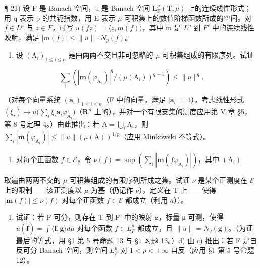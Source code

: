 ¶ 21) 设 F 是 Banach 空间，u 是 Banach 空间 \(\mathrm{L}_{\mathrm{F}}^{p}(\mathrm{T},\mu)\) 上的连续线性形式；用 q 表示 p 的共轭指数，用 E 表示 \(\mu\)-可积集上的数值阶梯函数所成的空间。对 \(f \in L^{p}\) 与 \(z \in F\)，可写 \(u(fz) = \langle z, m(f) \rangle\)，其中 m 是 \(L^{p}\) 到 \(F'\) 中的连续线性映射，满足 \(|m(f)| \leqslant \|u\| \cdot N_{p}(f)\)。

\begin{enumerate}
\def\labelenumi{\alph{enumi})}
\tightlist
\item
  设 \((\mathrm{A}_i)_{1\leqslant i\leqslant n}\) 是由两两不交且非可忽略的 \(\mu\)-可积集组成的有限序列。试证
\end{enumerate}

\[
\sum_ {i} \left(| \mathbf {m} (\varphi_ {\mathrm{A} _ {i}}) | ^ {q} / (\mu (\mathrm{A} _ {i})) ^ {q - 1}\right) \leqslant \| u \| ^ {q}.
\]

（对每个向量系统 \((\mathbf{a}_i)_{1\leqslant i\leqslant n}\)（F 中的向量，满足 \(|\mathbf{a}_i| = 1\)），考虑线性形式 \((\xi_i)\mapsto u\big(\sum_i\xi_i\mathbf{a}_i\varphi_{\mathrm{A}_i}\big)\)（\(\mathbf{R}^n\) 上的），并对一个有限支集的测度应用第 V 章 §5，第 8 号定理 4。）由此推出：若 \(\mathrm{A} = \bigcup_{i}\mathrm{A}_{i}\)，则 \(\sum_{i}|\mathbf{m}(\varphi_{\mathrm{A}_i})|\leqslant \| u\| (\mu (\mathrm{A}))^{1 / p}\)（应用 Minkowski 不等式）。

\begin{enumerate}
\def\labelenumi{\alph{enumi})}
\setcounter{enumi}{1}
\tightlist
\item
  对每个正函数 \(f \in \mathcal{E}\)，令 \(\nu(f) = \sup\left(\sum_{i} |\mathbf{m}(f\varphi_{\mathrm{A}_i})|\right)\)，其中 \((\mathrm{A}_i)\)
\end{enumerate}

取遍由两两不交的 \(\mu\)-可积集组成的有限序列所成之集。试证 \(\nu\) 是某个正测度在 \(\mathcal{E}\) 上的限制——该正测度以 \(\mu\) 为基（仍记作 \(\nu\)），定义在 T 上——使得 \(|\mathbf{m}(f)| \leqslant \nu(f)\) 对每个正函数 \(f \in \mathcal{E}\) 都成立（利用 \(a\)））。

\begin{enumerate}
\def\labelenumi{\alph{enumi})}
\setcounter{enumi}{2}
\tightlist
\item
  试证：若 F 可分，则存在 T 到 F' 中的映射 g，标量 μ-可测，使得 \(u(\widetilde{\mathbf{f}})=\int\langle\mathbf{f},\mathbf{g}\rangle d\mu\) 对每个函数 \(f\in L_{F}^{p}\) 都成立，且 \(\|u\|=N_{q}(\mathbf{g})\)。（为证最后的等式，用 §1 第 5 号命题 13 与 §1 习题 13。）d) 由 c) 推出：若 F 是自反可分 Banach 空间，则空间 \(L_{F}^{p}\) 对 \(1<p<+\infty\) 自反（应用 §1 第 5 号命题 12）。
\end{enumerate}


